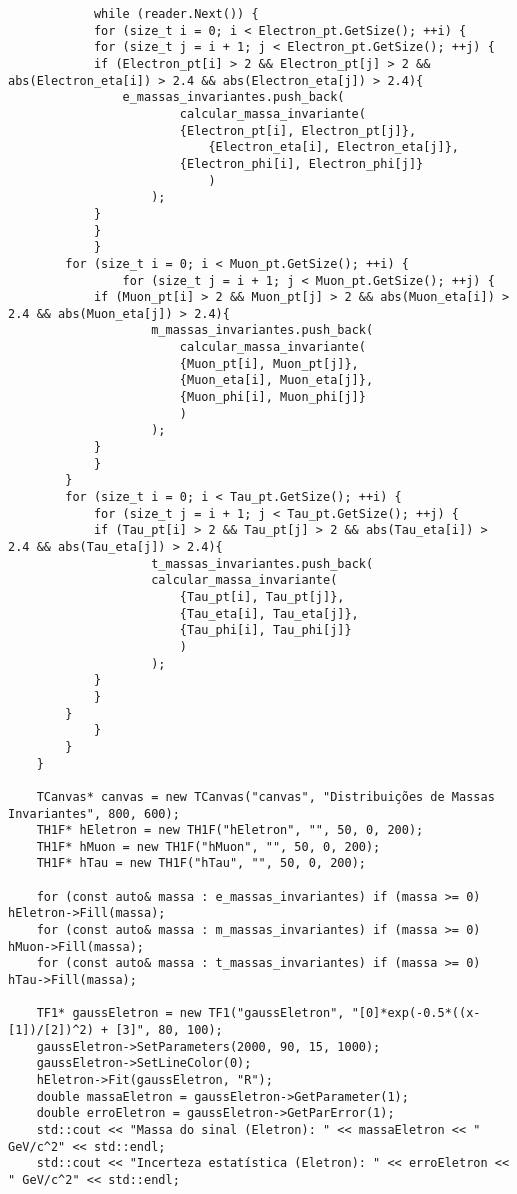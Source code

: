\documentclass[a4 paper]{article}
\numberwithin{equation}{section}
\newcommand{\0}{\mathbf{0}}
\begin{document}
\begin{lstlisting}
            while (reader.Next()) {
    		for (size_t i = 0; i < Electron_pt.GetSize(); ++i) {
		    for (size_t j = i + 1; j < Electron_pt.GetSize(); ++j) {
			if (Electron_pt[i] > 2 && Electron_pt[j] > 2 && abs(Electron_eta[i]) > 2.4 && abs(Electron_eta[j]) > 2.4){
			    e_massas_invariantes.push_back(
   	                    calcular_massa_invariante(
        	            {Electron_pt[i], Electron_pt[j]},
                     	    {Electron_eta[i], Electron_eta[j]},
   	                    {Electron_phi[i], Electron_phi[j]}
            	            )
		            );
			}
		    }
	        }
		for (size_t i = 0; i < Muon_pt.GetSize(); ++i) {
     		    for (size_t j = i + 1; j < Muon_pt.GetSize(); ++j) {
			if (Muon_pt[i] > 2 && Muon_pt[j] > 2 && abs(Muon_eta[i]) > 2.4 && abs(Muon_eta[j]) > 2.4){
		            m_massas_invariantes.push_back(
                  	    calcular_massa_invariante(
 	                    {Muon_pt[i], Muon_pt[j]},
          	            {Muon_eta[i], Muon_eta[j]},
                 	    {Muon_phi[i], Muon_phi[j]}
	                    )
		            );
			}
		    }
		}
		for (size_t i = 0; i < Tau_pt.GetSize(); ++i) {
		    for (size_t j = i + 1; j < Tau_pt.GetSize(); ++j) {
			if (Tau_pt[i] > 2 && Tau_pt[j] > 2 && abs(Tau_eta[i]) > 2.4 && abs(Tau_eta[j]) > 2.4){
	        	    t_massas_invariantes.push_back(
	   	    	    calcular_massa_invariante(
	                    {Tau_pt[i], Tau_pt[j]},
        	            {Tau_eta[i], Tau_eta[j]},
                	    {Tau_phi[i], Tau_phi[j]}
                	    )
		            );
			}
		    }
		}
            }
        }
    }

    TCanvas* canvas = new TCanvas("canvas", "Distribuições de Massas Invariantes", 800, 600);
    TH1F* hEletron = new TH1F("hEletron", "", 50, 0, 200);
    TH1F* hMuon = new TH1F("hMuon", "", 50, 0, 200);
    TH1F* hTau = new TH1F("hTau", "", 50, 0, 200);

    for (const auto& massa : e_massas_invariantes) if (massa >= 0) hEletron->Fill(massa);
    for (const auto& massa : m_massas_invariantes) if (massa >= 0) hMuon->Fill(massa);
    for (const auto& massa : t_massas_invariantes) if (massa >= 0) hTau->Fill(massa);

    TF1* gaussEletron = new TF1("gaussEletron", "[0]*exp(-0.5*((x-[1])/[2])^2) + [3]", 80, 100);
    gaussEletron->SetParameters(2000, 90, 15, 1000);
    gaussEletron->SetLineColor(0);
    hEletron->Fit(gaussEletron, "R");
    double massaEletron = gaussEletron->GetParameter(1);
    double erroEletron = gaussEletron->GetParError(1);
    std::cout << "Massa do sinal (Eletron): " << massaEletron << " GeV/c^2" << std::endl;
    std::cout << "Incerteza estatística (Eletron): " << erroEletron << " GeV/c^2" << std::endl;


\end{lstlisting}
\end{document}
